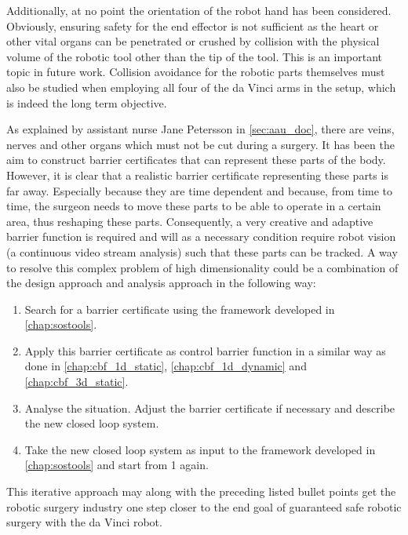 Additionally, at no point  the orientation of the robot hand has been considered. Obviously, ensuring safety for the end effector is not sufficient as the heart or other vital organs can be penetrated or crushed by collision with the physical volume of the robotic tool other than the tip of the tool. This is an important topic in future work. Collision avoidance for the robotic parts themselves must also be studied when employing all four of the da Vinci arms in the setup, which is indeed the long term objective.

As explained by assistant nurse Jane Petersson in \autoref{sec:aau_doc}, there are veins, nerves and other organs which must not be cut during a surgery. It has been the aim to construct barrier certificates that can represent these parts of the body. However, it is clear that a realistic barrier certificate representing these parts is far away. Especially because they are time dependent and because, from time to time, the surgeon needs to move these parts to be able to operate in a certain area, thus reshaping these parts. Consequently, a very creative and adaptive barrier function is required and will as a necessary condition require robot vision (a continuous video stream analysis) such that these parts can be tracked. A way to resolve this complex problem of high dimensionality could be a combination of the design approach and analysis approach in the following way:
\begin{enumerate}
\item Search for a barrier certificate using the framework developed in \autoref{chap:sostools}.
\item Apply this barrier certificate as control barrier function in a similar way as done in \autoref{chap:cbf_1d_static}, \autoref{chap:cbf_1d_dynamic} and \autoref{chap:cbf_3d_static}.
\item Analyse the situation. Adjust the barrier certificate if necessary and describe the new closed loop system.
\item Take the new closed loop system as input to the framework developed in \autoref{chap:sostools} and start from 1 again.
\end{enumerate}
This iterative approach may along with the preceding listed bullet points get the robotic surgery industry one step closer to the end goal of guaranteed safe robotic surgery with the da Vinci robot. 

